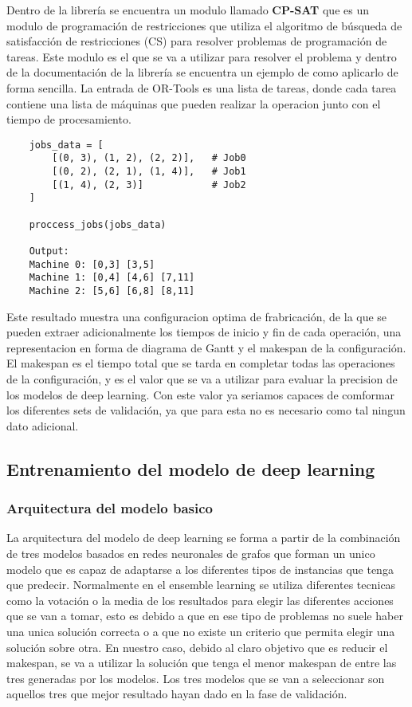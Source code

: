 Dentro de la librería se encuentra un modulo llamado \textbf{CP-SAT} que es un modulo de programación
de restricciones que utiliza el algoritmo de búsqueda de satisfacción de restricciones (CS) para resolver
problemas de programación de tareas. Este modulo es el que se va a utilizar para resolver el problema y
dentro de la documentación \cite{ortools-jobshop} de la librería se encuentra un ejemplo de como 
aplicarlo de forma sencilla. La entrada de OR-Tools es una lista de tareas, donde cada tarea contiene
una lista de máquinas que pueden realizar la operacion junto con el tiempo de procesamiento.\medskip

\begin{lstlisting}
    jobs_data = [                   
        [(0, 3), (1, 2), (2, 2)],   # Job0
        [(0, 2), (2, 1), (1, 4)],   # Job1
        [(1, 4), (2, 3)]            # Job2
    ]
   
    proccess_jobs(jobs_data)

    Output:
    Machine 0: [0,3] [3,5]
    Machine 1: [0,4] [4,6] [7,11]
    Machine 2: [5,6] [6,8] [8,11]
\end{lstlisting}

Este resultado muestra una configuracion optima de frabricación, de la que se pueden extraer
adicionalmente los tiempos de inicio y fin de cada operación, una representacion en forma de
diagrama de Gantt y el makespan de la configuración. El makespan es el tiempo total que se 
tarda en completar todas las operaciones de la configuración, y es el valor que se va a utilizar
para evaluar la precision de los modelos de deep learning. Con este valor ya seriamos capaces
de comformar los diferentes sets de validación, ya que para esta no es necesario como tal ningun
dato adicional. 

\subsection{Entrenamiento del modelo de deep learning}
\subsubsection{Arquitectura del modelo basico}
La arquitectura del modelo de deep learning se forma a partir de la combinación de tres 
modelos basados en redes neuronales de grafos que forman un unico modelo que es capaz 
de adaptarse a los diferentes tipos de instancias que tenga que predecir. Normalmente en el
ensemble learning se utiliza diferentes tecnicas como la votación o la media de los resultados
para elegir las diferentes acciones que se van a tomar, esto es debido a que en ese tipo de problemas
no suele haber una unica solución correcta o a que no existe un criterio que permita 
elegir una solución sobre otra. En nuestro caso, debido al claro objetivo que es reducir 
el makespan, se va a utilizar la solución que tenga el menor makespan de entre las tres 
generadas por los modelos. Los tres modelos que se van a seleccionar son aquellos tres 
que mejor resultado hayan dado en la fase de validación.\medskip

